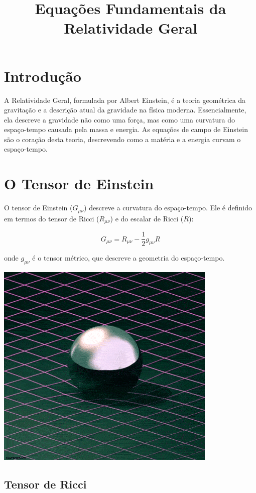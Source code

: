 \documentclass[a4paper,12pt]{article}
\title{Equações Fundamentais da Relatividade Geral}
\author{}
\date{}
\begin{document}
\maketitle
\thispagestyle{empty}

\section*{Introdução}

A Relatividade Geral, formulada por Albert Einstein, é a teoria geométrica da gravitação e a descrição atual da gravidade na física moderna. Essencialmente, ela descreve a gravidade não como uma força, mas como uma curvatura do espaço-tempo causada pela massa e energia. As equações de campo de Einstein são o coração desta teoria, descrevendo como a matéria e a energia curvam o espaço-tempo.

\section{O Tensor de Einstein}

O tensor de Einstein ($G_{\mu\nu}$) descreve a curvatura do espaço-tempo. Ele é definido em termos do tensor de Ricci ($R_{\mu\nu}$) e do escalar de Ricci ($R$):

$$G_{\mu\nu} = R_{\mu\nu} - \frac{1}{2}g_{\mu\nu}R$$

onde $g_{\mu\nu}$ é o tensor métrico, que descreve a geometria do espaço-tempo.

\includegraphics{tensor.gif}

\subsection{Tensor de Ricci}
\end{document}
